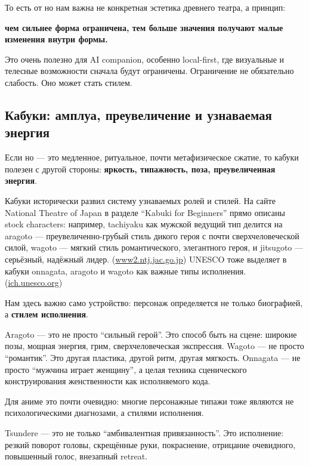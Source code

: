 То есть от но нам важна не конкретная эстетика древнего театра, а
принцип:

\textbf{чем сильнее форма ограничена, тем больше значения получают малые
изменения внутри формы.}

Это очень полезно для AI companion, особенно local-first, где визуальные
и телесные возможности сначала будут ограничены. Ограничение не
обязательно слабость. Оно может стать стилем.

\subsection*{Кабуки: амплуа, преувеличение и узнаваемая энергия}

Если но --- это медленное, ритуальное, почти метафизическое сжатие, то
кабуки полезен с другой стороны: \textbf{яркость, типажность, поза,
преувеличенная энергия}.

Кабуки исторически развил систему узнаваемых ролей и стилей. На сайте
National Theatre of Japan в разделе ``Kabuki for Beginners'' прямо
описаны stock characters: например, tachiyaku как мужской ведущий тип
делится на aragoto --- преувеличенно-грубый стиль дикого героя с почти
сверхчеловеческой силой, wagoto --- мягкий стиль романтического,
элегантного героя, и jitsugoto --- серьёзный, надёжный лидер.
(\href{https://www2.ntj.jac.go.jp/dglib/contents/learn/edc25/en/evolution/stock-characters.html?utm_source=chatgpt.com}{www2.ntj.jac.go.jp})
UNESCO тоже выделяет в кабуки onnagata, aragoto и wagoto как важные типы
исполнения.
(\href{https://ich.unesco.org/en/RL/kabuki-theatre-00163?utm_source=chatgpt.com}{ich.unesco.org})

Нам здесь важно само устройство: персонаж определяется не только
биографией, а \textbf{стилем исполнения}.

Aragoto --- это не просто ``сильный герой''. Это способ быть на сцене:
широкие позы, мощная энергия, грим, сверхчеловеческая экспрессия. Wagoto
--- не просто ``романтик''. Это другая пластика, другой ритм, другая
мягкость. Onnagata --- не просто ``мужчина играет женщину'', а целая
техника сценического конструирования женственности как исполняемого
кода.

Для аниме это почти очевидно: многие персонажные типажи тоже являются не
психологическими диагнозами, а стилями исполнения.

Tsundere --- это не только ``амбивалентная привязанность''. Это
исполнение: резкий поворот головы, скрещённые руки, покраснение,
отрицание очевидного, повышенный голос, внезапный retreat.


